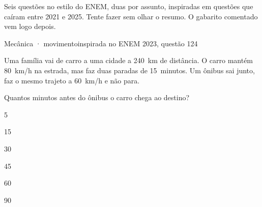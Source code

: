 \clearpage
{}\label{pg:treino}
Seis questões no estilo do ENEM, duas por assunto, inspiradas em questões que caíram entre 2021 e 2025.
Tente fazer sem olhar o resumo. O gabarito comentado vem logo depois.

\begin{treino}{Mecânica · movimento\hfill\normalfont\footnotesize inspirada no ENEM 2023, questão 124}
\begin{minipage}[c]{0.56\linewidth}
Uma família vai de carro a uma cidade a 240~km de distância. O carro mantém 80~km/h na estrada, mas faz duas paradas de 15~minutos.
Um ônibus sai junto, faz o mesmo trajeto a 60~km/h e não para.

\smallskip Quantos minutos antes do ônibus o carro chega ao destino?
\end{minipage}\hfill
\begin{minipage}[c]{0.41\linewidth}\centering
{}
\end{minipage}
\begin{multicols}{5}
\begin{alternativas}\item 15 \item 30 \item 45 \item 60 \item 90\end{alternativas}
\end{multicols}
\end{treino}

